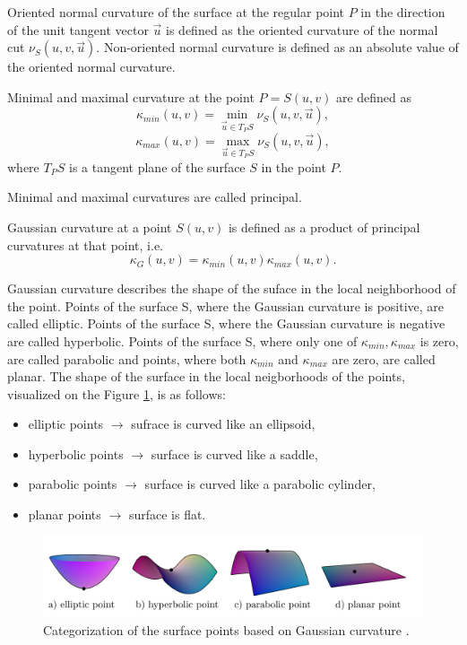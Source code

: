 \begin{definition}
    Oriented normal curvature of the surface at the regular point $P$ in the direction of the unit tangent vector
    $\vec{u}$ is defined as the oriented curvature of the normal cut $\nu_S(u, v, \vec{u})$.
    Non-oriented normal curvature is defined as an absolute value of the oriented normal curvature.
\end{definition}

\begin{definition}
    Minimal and maximal curvature at the point $P = S(u,v)$ are defined as
    $$\kappa_{min}(u,v) = \min_{\vec{u} \in T_PS} \nu_S(u, v, \vec{u}),$$
    $$\kappa_{max}(u,v) = \max_{\vec{u} \in T_PS} \nu_S(u, v, \vec{u}),$$
    where $T_PS$ is a tangent plane of the surface $S$ in the point $P$.

    Minimal and maximal curvatures are called principal.
\end{definition}

\begin{definition}
    Gaussian curvature at a point $S(u, v)$ is defined as a product of principal curvatures
    at that point, i.e.
    $$\kappa_G(u, v) = \kappa_{min}(u,v) \kappa_{max}(u,v).$$
\end{definition}

Gaussian curvature describes the shape of the suface in the local neighborhood of the point.
Points of the surface S, where the Gaussian curvature is positive, are called elliptic.
Points of the surface S, where the Gaussian curvature is negative are called hyperbolic.
Points of the surface S, where only one of $\kappa_{min}, \kappa_{max}$ is zero, are called
parabolic and points, where both $\kappa_{min}$ and $\kappa_{max}$ are zero, are called planar.
The shape of the surface in the local neigborhoods of the points, visualized on the
Figure \ref{img:33}, is as follows:
\begin{itemize}
    \item {elliptic points $\longrightarrow$ sufrace is curved like an ellipsoid,}
    \item {hyperbolic points $\longrightarrow$ surface is curved like a saddle,}
    \item {parabolic points $\longrightarrow$ surface is curved like a parabolic cylinder,}
    \item {planar points $\longrightarrow$ surface is flat.}
\end{itemize}

\begin{figure}
    \centerline{\includegraphics[scale=0.5]{images/img33}}
    \caption[Categorization of the surface points based on Gaussian curvature]
    {Categorization of the surface points based on Gaussian curvature \cite{morris2003client}.}
    \label{img:33}
\end{figure}

